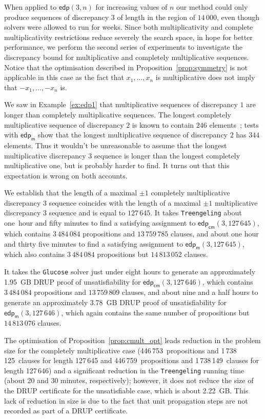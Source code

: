 \documentclass{article} \usepackage[utf8]{inputenc}
\newcommand*{\edp}{\ensuremath{\mathsf{edp}}}
\newcommand*{\Mult}{\ensuremath{\mathsf{edp_{m}}}}
\newcommand*{\CMult}{\ensuremath{\mathsf{edp_{cm}}}}
\newcommand*{\Treengeling}{\texttt{Treengeling}\xspace}
\newcommand*{\Glucose}{\texttt{Glucose}\xspace}
\begin{document}
\smallskip

When applied to $\edp(3,n)$ for increasing values of $n$ our method could only
produce sequences of discrepancy $3$ of length in the region of $14\,000$, even
though solvers were allowed to run for weeks.  Since both  multiplicativity
and complete multiplicativity restrictions reduce severely the search space, in
hope for better performance, we perform the second series of experiments to
investigate the discrepancy bound for multiplicative and
completely multiplicative sequences. Notice that the optimisation
described in Proposition~\ref{prop:symmetry} is not applicable in this case as the
fact that $x_1,\dots, x_n$ is multiplicative does not imply that $-x_1,\dots,
-x_n$ is.

We saw in Example~\ref{ex:edp1} that multiplicative sequences of discrepancy
$1$ are longer than completely multiplicative sequences. The longest completely
multiplicative sequence of discrepancy $2$ is known to contain $246$
elements~\cite{Polymath2}; tests with $\Mult$ show that 
the longest multiplicative sequence of discrepancy $2$ has $344$ elements.
Thus it wouldn't be unreasonable to assume that 
the longest multiplicative discrepancy $3$ sequence is longer
than the longest completely multiplicative one, but is probably harder to find.
It turns out that this expectation is wrong on both accounts.


We establish that the length of a maximal $\pm 1$ completely multiplicative
discrepancy $3$ sequence coincides with the length of a maximal $\pm1$
multiplicative discrepancy $3$ sequence and is equal to $127\,645$. 
It takes \Treengeling about one~hour and fifty minutes to find
a satisfying assignment to $\CMult(3, 127\, 645)$, 
which contains $3\,484\,084$ propositions and $13\,759\,785$ clauses,
and about one hour and thirty five minutes to find a satisfying 
assignment to $\Mult(3, 127\, 645)$, 
which also contains $3\,484\,084$ propositions but $14\,813\,052$ clauses.


It takes the \Glucose solver just under eight hours to  
generate an approximately 1.95~GB DRUP  proof of 
unsatisfiability for $\CMult(3, 127\,646)$, which contains $3\,484\,084$ propositions
and $13\,759\,809$ clauses,
and about nine and a half hours to generate an approximately
3.78~GB DRUP proof of unsatisfiability for 
$\Mult(3, 127\,646)$,
which again contains the same number of propositions but $14\,813\,076$ clauses.

The optimisation of Proposition~\ref{prop:cmult_opt} leads
reduction in the problem size for the completely multiplicative case 
(446\,753~propositions and 1\,738\,125~clauses for length
127\,645 and 446\,759~propositions and 1\,738\,149~clauses for
length 127\,646) and a significant reduction in the 
\Treengeling running time (about 20 and 30 minutes, respectively); however, it 
does not 
reduce the size of the DRUP certificate for the 
unsatisfiable case, which is about 2.22~GB. This lack of reduction in
size is due to the fact that unit propagation steps are not recorded 
as part of a DRUP certificate.
\end{document}
